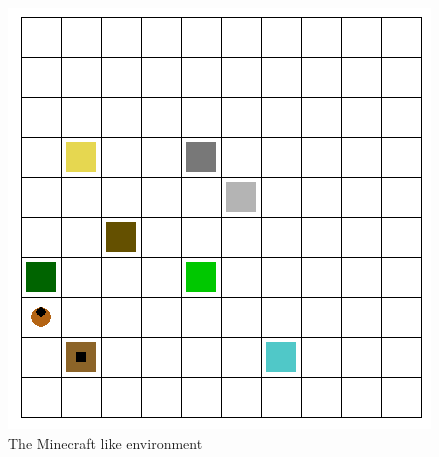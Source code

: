 \documentclass[letterpaper]{article}
\begin{document}
\begin{figure}
    \centering
    \includegraphics[scale=0.5]{figs/minecraft.png}
    \caption{The Minecraft like environment}
    \label{fig:minecraft}
\end{figure}
\end{document}
